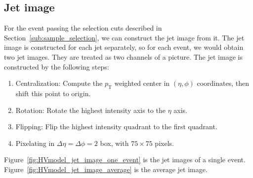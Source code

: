 \documentclass[12pt]{article}
\begin{document}
	\subsection{Jet image}%
	\label{sub:jet_image}
		For the event passing the selection cuts described in Section~\ref{sub:sample_selection}, we can construct the jet image from it. The jet image is constructed for each jet separately, so for each event, we would obtain two jet images. They are treated as two channels of a picture. The jet image is constructed by the following steps:
		\begin{enumerate}
			\item Centralization: Compute the $p_{\text{T}}$ weighted center in $\left( \eta,\phi \right) $ coordinates, then shift this point to origin.
			\item Rotation: Rotate the highest intensity axis to the $\eta$ axis.
			\item Flipping:	Flip the highest intensity quadrant to the first quadrant.
			\item Pixelating in $\Delta\eta = \Delta\phi = 2$ box, with $75\times 75$ pixels.
		\end{enumerate}

		Figure~\ref{fig:HVmodel_jet_image_one_event} is the jet images of a single event. Figure~\ref{fig:HVmodel_jet_image_average} is the average jet image. 
\end{document}
